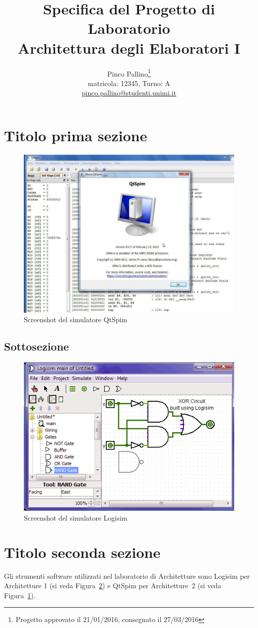 \documentclass[11pt]{article}
\title{Specifica del Progetto di Laboratorio \\ Architettura degli Elaboratori I}
\author{Pinco Pallino\thanks{Progetto approvato il 21/01/2016, consegnato il 27/03/2016}\\ matricola: 12345, Turno: A\\ \url{pinco.pallino@studenti.unimi.it}}
\date{} %
\begin{document}
\maketitle


\section{Titolo prima sezione}

\begin{figure}[!htpb]
\centering
\includegraphics[width=0.3\columnwidth]{immagini/esempio_immagine_spim}
\caption{Screenshot del simulatore QtSpim}
\label{fig:qtspim}
\end{figure}

\subsection{Sottosezione}

\begin{figure}[!htpb]
\centering
\includegraphics[width=0.3\columnwidth]{immagini/esempio_immagine_logisim}
\caption{Screenshot del simulatore Logisim}
\label{fig:logisim}
\end{figure}

\section{Titolo seconda sezione}
Gli strumenti software utilizzati nel laboratorio di Architetture sono Logisim per Architetture 1 (si veda Figura~\ref{fig:logisim}) e QtSpim per Architetture~2 (si veda Figura~\ref{fig:qtspim}).
\end{document}
